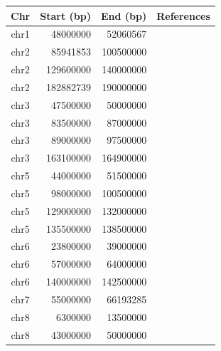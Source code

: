 \documentclass[12pt]{article}
\begin{document}
\begin{table}
\label{tab:highLD}
\center
\begin{tabular}{crrl}
Chr & Start (bp) & End (bp) & References \\
\hline
chr1   & 48000000     & 52060567   &    \citep{anderson2010, price2008, weale2010} \\
chr2   & 85941853     & 100500000   &    \citep{anderson2010, price2008, weale2010} \\
chr2   & 129600000   & 140000000   &    \citep{price2008, novembre2008, weale2010, raska2012, conomos2016, prive2018} \\
chr2   & 182882739    & 190000000   &    \citep{anderson2010, price2008, weale2010} \\
chr3   & 47500000     & 50000000    &   \citep{anderson2010, price2008, weale2010}  \\
chr3   & 83500000     & 87000000    &   \citep{anderson2010, price2008, weale2010} \\
chr3   & 89000000     &   97500000   &    \citep{price2008, weale2010} \\
chr3   & 163100000    &   164900000   &    \citep{prive2018} \\
chr5   & 44000000     &   51500000    &   \citep{fellay2007, anderson2010, price2008, weale2010} \\
chr5   & 98000000     &  100500000   &    \citep{price2008, weale2010} \\
chr5   & 129000000    &   132000000   &    \citep{anderson2010, price2008, weale2010} \\
chr5   & 135500000    &   138500000   &   \citep{price2008, weale2010} \\
chr6   &  23800000     &   39000000   &    \citep{fellay2007, anderson2010, price2008, novembre2008, weale2010, raska2012, conomos2016, prive2018} \\
chr6   &  57000000     &   64000000   &    \citep{anderson2010, price2008, weale2010}  \\
chr6   & 140000000    &   142500000   &    \citep{anderson2010, price2008, weale2010}  \\
chr7   &  55000000     &   66193285   &    \citep{anderson2010, price2008, weale2010}  \\
chr8   &   6300000      &  13500000   &    \citep{fellay2007, anderson2010, price2008, novembre2008, tian2008, weale2010, raska2012, conomos2016, prive2018} \\
chr8   &  43000000    &    50000000   &    \citep{anderson2010, price2008, weale2010}  \\

\end{tabular}
\end{table}
\end{document}
